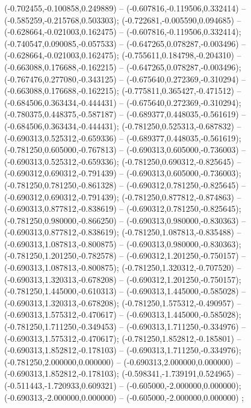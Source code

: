  (-0.702455,-0.100858,0.249889) -- (-0.607816,-0.119506,0.332414) -- (-0.585259,-0.215768,0.503303);
 (-0.722681,-0.005590,0.094685) -- (-0.628664,-0.021003,0.162475) -- (-0.607816,-0.119506,0.332414);
 (-0.740547,0.090085,-0.057533) -- (-0.647265,0.078287,-0.003496) -- (-0.628664,-0.021003,0.162475);
 (-0.755611,0.184798,-0.204310) -- (-0.663088,0.176688,-0.162215) -- (-0.647265,0.078287,-0.003496);
 (-0.767476,0.277080,-0.343125) -- (-0.675640,0.272369,-0.310294) -- (-0.663088,0.176688,-0.162215);
 (-0.775811,0.365427,-0.471512) -- (-0.684506,0.363434,-0.444431) -- (-0.675640,0.272369,-0.310294);
 (-0.780375,0.448375,-0.587187) -- (-0.689377,0.448035,-0.561619) -- (-0.684506,0.363434,-0.444431);
 (-0.781250,0.525313,-0.687832) -- (-0.690313,0.525312,-0.659336) -- (-0.689377,0.448035,-0.561619);
 (-0.781250,0.605000,-0.767813) -- (-0.690313,0.605000,-0.736003) -- (-0.690313,0.525312,-0.659336);
 (-0.781250,0.690312,-0.825645) -- (-0.690312,0.690312,-0.791439) -- (-0.690313,0.605000,-0.736003);
 (-0.781250,0.781250,-0.861328) -- (-0.690312,0.781250,-0.825645) -- (-0.690312,0.690312,-0.791439);
 (-0.781250,0.877812,-0.874863) -- (-0.690313,0.877812,-0.838619) -- (-0.690312,0.781250,-0.825645);
 (-0.781250,0.980000,-0.866250) -- (-0.690313,0.980000,-0.830363) -- (-0.690313,0.877812,-0.838619);
 (-0.781250,1.087813,-0.835488) -- (-0.690313,1.087813,-0.800875) -- (-0.690313,0.980000,-0.830363);
 (-0.781250,1.201250,-0.782578) -- (-0.690312,1.201250,-0.750157) -- (-0.690313,1.087813,-0.800875);
 (-0.781250,1.320312,-0.707520) -- (-0.690313,1.320313,-0.678208) -- (-0.690312,1.201250,-0.750157);
 (-0.781250,1.445000,-0.610313) -- (-0.690313,1.445000,-0.585028) -- (-0.690313,1.320313,-0.678208);
 (-0.781250,1.575312,-0.490957) -- (-0.690313,1.575312,-0.470617) -- (-0.690313,1.445000,-0.585028);
 (-0.781250,1.711250,-0.349453) -- (-0.690313,1.711250,-0.334976) -- (-0.690313,1.575312,-0.470617);
 (-0.781250,1.852812,-0.185801) -- (-0.690313,1.852812,-0.178103) -- (-0.690313,1.711250,-0.334976);
 (-0.781250,2.000000,0.000000) -- (-0.690313,2.000000,0.000000) -- (-0.690313,1.852812,-0.178103);
 (-0.598341,-1.739191,0.524965) -- (-0.511443,-1.720933,0.609321) -- (-0.605000,-2.000000,0.000000);
 (-0.690313,-2.000000,0.000000) -- (-0.605000,-2.000000,0.000000) ;
